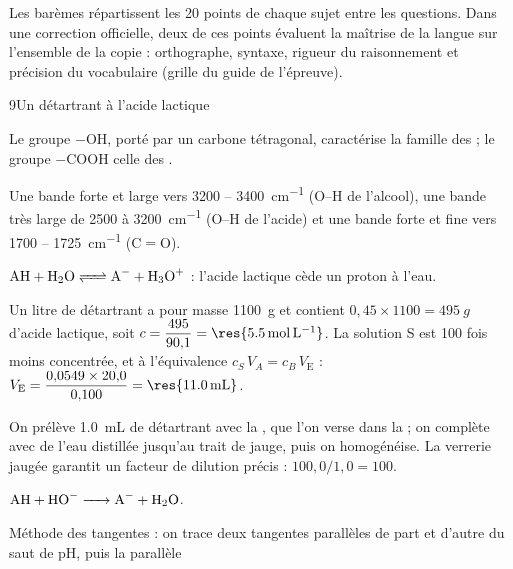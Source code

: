 
{\otLight\fontsize{8.5}{11.5}\selectfont\color{otMuted}\noindent Les barèmes répartissent les 20 points de chaque sujet entre les
questions. Dans une correction officielle, deux de ces points évaluent la maîtrise de la langue sur l'ensemble de la copie :
orthographe, syntaxe, rigueur du raisonnement et précision du vocabulaire (grille du guide de l'épreuve).\par}

\begin{corrigeBac}{9}{Un détartrant à l'acide lactique}
\begin{questions}
\item Le groupe  $-\mathrm{OH}$, porté par un carbone tétragonal, caractérise la famille des
 ; le groupe  $-\mathrm{COOH}$ celle des . 
\item Une bande forte et large vers 3200 -- \qty{3400}{cm^{-1}} (O--H de l'alcool), une bande très large de 2500 à
\qty{3200}{cm^{-1}} (O--H de l'acide) et une bande forte et fine vers 1700 -- \qty{1725}{cm^{-1}} (C$=$O). 
\item $\ce{AH + H2O <=> A- + H3O+}$ : l'acide lactique cède un proton à l'eau. 
\end{questions}
\begin{questions}[resume]
\item Un litre de détartrant a pour masse \qty{1100}{g} et contient $0{,}45\times1100=\qty{495}{g}$ d'acide lactique, soit
$c=\dfrac{495}{90{,}1}=\res{\qty{5,5}{mol.L^{-1}}}$. La solution S est 100 fois moins concentrée, et à l'équivalence
$c_S\,V_A=c_B\,V_\mathrm{E}$ : $V_\mathrm{E}=\dfrac{0{,}0549\times20{,}0}{0{,}100}=\res{\qty{11,0}{mL}}$. \pts{1 pt}
\item On prélève \qty{1,0}{mL} de détartrant avec la , que l'on verse dans la
 ; on complète avec de l'eau distillée jusqu'au trait de jauge, puis on homogénéise.
La verrerie jaugée garantit un facteur de dilution précis : $100{,}0/1{,}0=100$. 
\item $\ce{AH + HO- -> A- + H2O}$. 
\item Méthode des tangentes : on trace deux tangentes parallèles de part et d'autre du saut de pH, puis la parallèle

\end{questions}
\end{corrigeBac}
